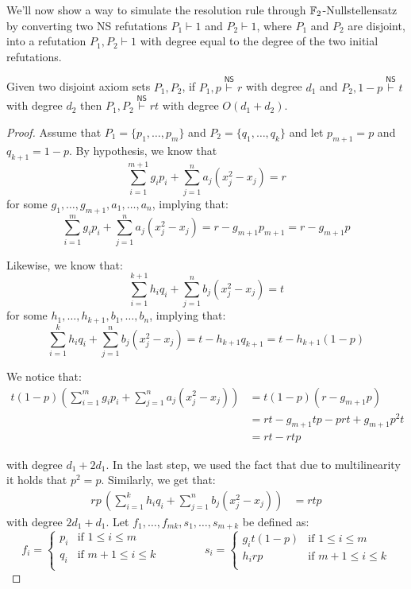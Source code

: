 We'll now show a way to simulate the resolution rule through $\mathbb{F}_2$-Nullstellensatz by converting two \textsf{NS} refutations $P_1 \stackrel{}{\vdash} 1$ and $P_2 \stackrel{}{\vdash} 1$, where $P_1$ and $P_2$ are disjoint, into a refutation  $P_1, P_2 \stackrel{}{\vdash} 1$ with degree equal to the degree of the two initial refutations.

\begin{lemma}
    \label{union_ref}
 Given two disjoint axiom sets $P_1, P_2$, if $P_1, p \stackrel{\mathsf{NS}}{\vdash} r$ with degree $d_1$ and $P_2, 1-p \stackrel{\mathsf{NS}}{\vdash} t$ with degree $d_2$ then $P_1, P_2 \stackrel{\mathsf{NS}}{\vdash} rt$ with degree $O(d_1 + d_2)$.
\end{lemma}

\begin{proof}
 Assume that $P_1 = \{p_1, \ldots, p_m\}$ and $P_2 = \{q_1, \ldots, q_k\}$ and let $p_{m+1} = p$ and $q_{k+1} = 1-p$. By hypothesis, we know that
    \[\sum_{i = 1}^{m+1} g_i p_i + \sum_{j = 1}^n a_j (x_j^2-x_j) = r\]
 for some $g_1, \ldots, g_{m+1}, a_1, \ldots, a_n$, implying that:
    \[\sum_{i = 1}^{m} g_i p_i + \sum_{j = 1}^n a_j (x_j^2-x_j) = r - g_{m+1} p_{m+1} = r-g_{m+1} p\]
    
 Likewise, we know that:
    \[\sum_{i = 1}^{k+1} h_i q_i + \sum_{j = 1}^n b_j (x_j^2-x_j) = t\]
 for some $h_1, \ldots, h_{k+1}, b_1, \ldots, b_n$, implying that:
    \[\sum_{i = 1}^{k} h_iq_i + \sum_{j = 1}^n b_j (x_j^2-x_j) = t-h_{k+1}q_{k+1} = t-h_{k+1}(1-p)\]

 We notice that:
    \[\begin{split}
 t(1-p) \left (\sum_{i = 1}^{m} g_i p_i + \sum_{j = 1}^n a_j (x_j^2-x_j) \right ) &= t(1-p)(r-g_{m+1} p) \\
        &= rt-g_{m+1} tp - prt + g_{m+1} p^2t \\
        &= rt-rtp
    \end{split}\]

 with degree $d_1+2d_1$. In the last step, we used the fact that due to multilinearity it holds that $p^2 = p$. Similarly, we get that:
    \[\begin{split}
 rp\, \left (\sum_{i = 1}^{k} h_iq_i + \sum_{j = 1}^n b_j (x_j^2-x_j)  \right ) &= rtp 
    \end{split}\]
 with degree $2d_1+d_1$. Let $f_1, \ldots, f_{mk}, s_1, \ldots, s_{m+k}$ be defined as:
    \[f_i = \left \{ \begin{array}{ll}
 p_i & \text{if } 1 \leq i \leq m \\
 q_i & \text{if } m+1 \leq i \leq k \\
    \end{array} \right .
 \qquad\qquad
 s_i = \left \{ \begin{array}{ll}
 g_i t(1-p) & \text{if } 1 \leq i \leq m \\
 h_irp & \text{if } m+1 \leq i \leq k \\
    \end{array} \right .\]
    

\end{proof}
